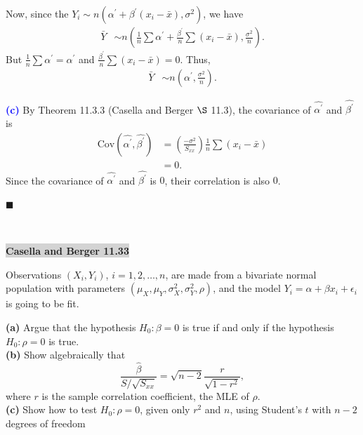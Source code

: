 \documentclass[12pt]{article}
\newcommand{\mybox}{%
    \collectbox{%
        \setlength{\fboxsep}{2pt}%
        \fbox{\BOXCONTENT}%
    }%
}
\begin{document}
Now, since the $Y_i \sim n(\alpha^{\prime} + \beta^{\prime}(x_i-\bar{x}), \sigma^2)$, we have 
\begin{align}
\bar{Y} &\sim n\left( \frac{1}{n} \sum \alpha^{\prime} + \frac{\beta^{\prime}}{n}\sum(x_i - \bar{x}), \frac{\sigma^2}{n} \right).
\end{align}
But $\frac{1}{n}\sum \alpha^{\prime} = \alpha^{\prime}$ and $\frac{\beta^{\prime}}{n}\sum(x_i - \bar{x}) = 0$. Thus,
\begin{align}
\bar{Y} &\sim n\left(\alpha^{\prime}, \frac{\sigma^2}{n}\right).
\end{align}

\noindent \textcolor{blue}{\textbf{(c)}} By Theorem 11.3.3 (Casella and Berger $\S$ 11.3), the covariance of $\hat{\alpha^{\prime}}$ and $\hat{\beta^{\prime}}$ is
\begin{align}
\text{Cov}\left(\hat{\alpha^{\prime}}, \hat{\beta^{\prime}} \right) &= \left(\frac{-\sigma^2}{S_{xx}}\right)\frac{1}{n}\sum(x_i - \bar{x}) \\
&= 0.
\end{align}
Since the covariance of $\hat{\alpha^{\prime}}$ and $\hat{\beta^{\prime}}$ is $0$, their correlation is also $0$.

\hfill$\blacksquare$


\vfill
\begin{center}
\end{center}
\begin{center}
\vspace{-0.6cm}
\hrulefill \\
\vspace{-0.7cm}
\hrulefill
\end{center}

\pagebreak

\noindent\mybox{\colorbox{lightgray}{\textbf{Casella and Berger 11.33}}}\hspace{3mm}\hrulefill 

\noindent Observations $(X_i, Y_i)$, $i = 1, 2, \ldots, n$, are made from a bivariate normal population with parameters $(\mu_X, \mu_Y, \sigma_X^2, \sigma_Y^2, \rho)$, and the model $Y_i = \alpha + \beta x_i + \epsilon_i$ is going to be fit.
\begin{flushleft}
\textbf{(a)} Argue that the hypothesis $H_0: \beta = 0$ is true if and only if the hypothesis $H_0: \rho = 0$ is true. \\
\textbf{(b)} Show algebraically that 
$$
\frac{\hat{\beta}}{S/\sqrt{S_{xx}}} = \sqrt{n-2}\frac{r}{\sqrt{1-r^2}}, 
$$
where $r$ is the sample correlation coefficient, the MLE of $\rho$.\\
\textbf{(c)} Show how to test $H_0: \rho = 0$, given only $r^2$ and $n$, using Student's $t$ with $n-2$ degrees of freedom
\end{flushleft}
\end{document}
